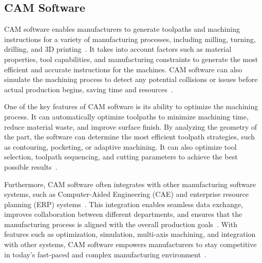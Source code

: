 \subsection{CAM Software}


CAM software enables manufacturers to generate toolpaths and machining instructions for a variety of manufacturing processes, including milling, turning, drilling, and 3D printing~\cite{Kumar.2019}. It takes into account factors such as material properties, tool capabilities, and manufacturing constraints to generate the most efficient and accurate instructions for the machines. CAM software can also simulate the machining process to detect any potential collisions or issues before actual production begins, saving time and resources~\cite{Bui.2019}.

One of the key features of CAM software is its ability to optimize the machining process. It can automatically optimize toolpaths to minimize machining time, reduce material waste, and improve surface finish. By analyzing the geometry of the part, the software can determine the most efficient toolpath strategies, such as contouring, pocketing, or adaptive machining. It can also optimize tool selection, toolpath sequencing, and cutting parameters to achieve the best possible results~\cite{Kyratsis.2020}.


Furthermore, CAM software often integrates with other manufacturing software systems, such as Computer-Aided Engineering (CAE) and enterprise resource planning (ERP) systems~\cite{Ramazanov.2020}. This integration enables seamless data exchange, improves collaboration between different departments, and ensures that the manufacturing process is aligned with the overall production goals~\cite{Kadam.2023}. With features such as optimization, simulation, multi-axis machining, and integration with other systems, CAM software empowers manufacturers to stay competitive in today's fast-paced and complex manufacturing environment~\cite{Kappmeyer.2021}.

